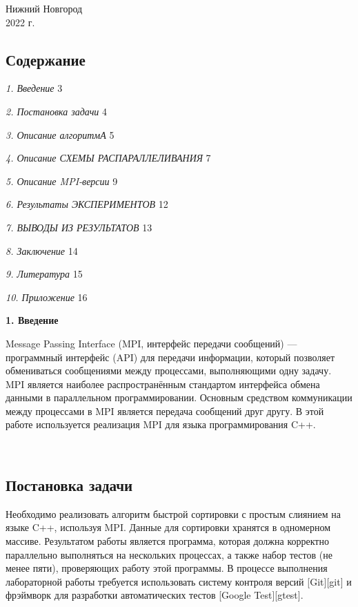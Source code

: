 \documentclass[]{article}
\begin{document}
Нижний Новгород\\
2022 г.

\subsection{Содержание}\label{ux441ux43eux434ux435ux440ux436ux430ux43dux438ux435}

\emph{1. Введение} 3

\emph{2. Постановка задачи} 4

\emph{3. Описание алгоритмА} 5

\emph{4. Описание СХЕМЫ РАСПАРАЛЛЕЛИВАНИЯ} 7

\emph{5. Описание MPI-версии} 9

\emph{6. Результаты ЭКСПЕРИМЕНТОВ} 12

\emph{7. ВЫВОДЫ ИЗ РЕЗУЛЬТАТОВ} 13

\emph{8. Заключение} 14

\emph{9. Литература} 15

\emph{10. Приложение} 16

\textbf{1. Введение}

Message Passing Interface (MPI, интерфейс передачи сообщений) ---
программный интерфейс (API) для передачи информации, который позволяет
обмениваться сообщениями между процессами, выполняющими одну задачу. MPI
является наиболее распространённым стандартом интерфейса обмена данными
в параллельном программировании. Основным средством коммуникации между
процессами в MPI является передача сообщений друг другу. В этой работе
используется реализация MPI для языка программирования C++.

\textbf{\\
}

\subsection{\texorpdfstring{\textbf{Постановка
задачи}}{Постановка задачи}}\label{ux43fux43eux441ux442ux430ux43dux43eux432ux43aux430-ux437ux430ux434ux430ux447ux438}

Необходимо реализовать алгоритм быстрой сортировки с простым слиянием на
языке C++, используя MPI. Данные для сортировки хранятся в одномерном
массиве. Результатом работы является программа, которая должна корректно
параллельно выполняться на нескольких процессах, а также набор тестов
(не менее пяти), проверяющих работу этой программы. В процессе
выполнения лабораторной работы требуется использовать систему контроля
версий {[}Git{]}{[}git{]} и фрэймворк для разработки автоматических
тестов {[}Google Test{]}{[}gtest{]}.
\end{document}
